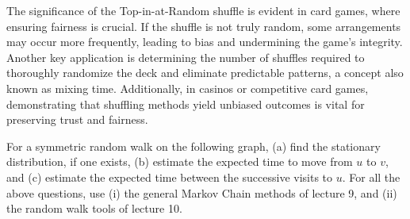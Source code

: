 \documentclass[12pt,letterpaper, onecolumn]{exam}
\begin{document}
{\begin{questions}
\begin{solution}
    The significance of the Top-in-at-Random shuffle is evident in card games, where ensuring fairness is crucial. If the shuffle is not truly random, some arrangements may occur more frequently, leading to bias and undermining the game's integrity. Another key application is determining the number of shuffles required to thoroughly randomize the deck and eliminate predictable patterns, a concept also known as mixing time. Additionally, in casinos or competitive card games, demonstrating that shuffling methods yield unbiased outcomes is vital for preserving trust and fairness.
    \end{solution}

    \question For a symmetric random walk on the following graph, (a) find the stationary distribution, if one exists, (b) estimate the expected time to move from $u$ to $v$, and (c) estimate the expected time between the successive visits to $u$. For all the above questions, use (i) the general Markov Chain methods of lecture 9, and (ii) the random walk tools of lecture 10.\droppoints
    \begin{solution}
\end{solution}
\end{questions}}
\end{document}
